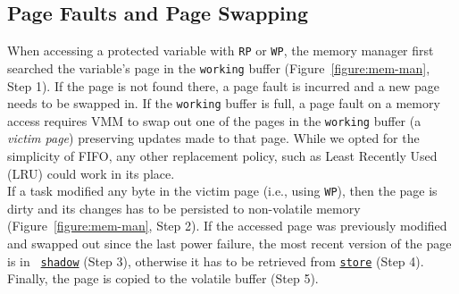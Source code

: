 \subsection{Page Faults and Page Swapping}
%
When accessing a protected variable with \texttt{RP} or \texttt{WP}, the memory
manager first searched the variable's page in the \texttt{working} buffer
(Figure~\ref{figure:mem-man}, Step 1).
If the page is not found there, a page fault is incurred and a new page needs to
be swapped in.
If the \texttt{working} buffer is full, a page fault on a memory access
requires VMM to swap out one of the pages in the \texttt{working} buffer (a
\emph{victim page}) preserving updates made to that page.
%
While we opted for the simplicity of FIFO, any other replacement policy, such
as Least Recently Used (LRU) could work in its place. \\
%
If a task modified any byte in the victim page (i.e., using \texttt{WP}), then
the page is dirty and its changes has to be persisted to non-volatile memory
(Figure~\ref{figure:mem-man}, Step 2).
If the accessed page was previously modified and swapped out since the last
power failure, the most recent version of the page is in {\tt
\underline{shadow}} (Step 3), otherwise it has to be retrieved from
{\tt \underline{store}} (Step 4).
Finally, the page is copied to the volatile buffer (Step 5). \\
%
